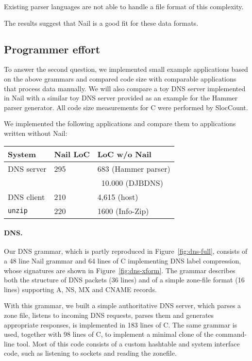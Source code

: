 Existing parser languages are not able to handle a file format of this complexity.

\noindent The results suggest that Nail is a good fit for these data formats. 



\subsection{Programmer effort}


\label{s:eval-effort}
To answer the second question, we implemented small example applications based on the above
grammars and compared code size with comparable applications that process data manually. We will
also compare a toy DNS server implemented in Nail with a similar toy DNS server provided as an
example for the Hammer parser generator. All code size measurements for C were performed by
SlocCount\cite{sloccount}.

\noindent We implemented the following applications and compare them to applications written without
Nail:

\noindent\begin{tabular}{@{}lll@{}} 
\toprule
\textbf{System} & \textbf{Nail LoC}  & \textbf{LoC w/o Nail} \\
\midrule
DNS server & 295 & 683 (Hammer parser)\\
&&  ~10.000 (DJBDNS)\\ 
DNS client & 210  & 4,615 (host) \\
\texttt{unzip} & 220 & 1600 (Info-Zip) \\
\bottomrule
\end{tabular}
\paragraph{DNS.}

Our DNS grammar, which is partly reproduced in Figure~\ref{fig:dns-full}, consists of a 48 line Nail
grammar and 64 lines of C implementing DNS label compression, whose signatures are shown in
Figure~\ref{fig:dns-xform}.
The grammar describes both the structure of DNS packets (36 lines) and of a simple zone-file format
(16 lines) supporting A, NS, MX and CNAME records. 

  
With this grammar, we built a simple authoritative DNS server, which parses a zone file, listens to incoming DNS
requests, parses them and generates appropriate responses, is implemented in 183 lines of C. The
same grammar is used, together with 98 lines of C, to implement a minimal clone of the
 command-line tool. Most of this code consists of a custom hashtable and system
interface code, such as listening to sockets and reading the zonefile. 


